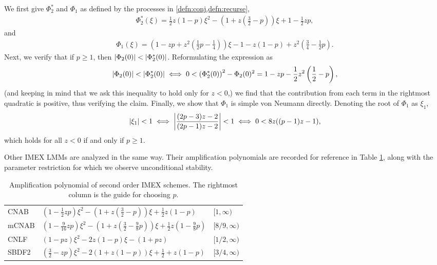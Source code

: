 We first give $\Phi_2^*$ and $\Phi_1$ as defined by the processes in \cref{defn:conj,defn:recurse},  
\begin{align}
\Phi_2^*(\xi) = \frac{1}{2}z(1-p) \xi^2 
- \left(1 + z\left(\frac{3}{2} - p \right)\right) \xi
+ 1 - \frac{1}{2}zp, 
\end{align}
and
\begin{align} 
\Phi_1(\xi) = \left(1 - zp + z^2 \left( \frac{1}{2} p - \frac{1}{4} \right) \right)\xi -1 - z(1-p) + z^2 \left( \frac{3}{4} - \frac{1}{2}p \right).
\end{align}
Next, we verify that if $p\geq 1$, then $\left|\Phi_2(0)\right| < \left|\Phi^*_2(0)\right|$. Reformulating the expression as
\begin{align*}
\left|\Phi_2(0)\right| < \left|\Phi^*_2(0)\right| 
\iff 
0 < \left(\Phi^*_2(0) \right)^2 - \Phi_2(0)^2
= 1 - zp - \frac{1}{2}z^2\left( \frac{1}{2} - p \right),
\end{align*}
(and keeping in mind that we ask this inequality to hold only for $z<0$,) we find that the contribution from each term  in the rightmost quadratic is positive, thus verifying the claim.
Finally, we show that $\Phi_1$ is simple von Neumann directly. Denoting the root of $\Phi_1$ as $\xi_1$, 
\begin{align*}
	\left|\xi_1\right| < 1 
\iff \left|\frac{(2p-3)z-2}{(2p-1)z-2}\right| < 1
\iff 0< 8z((p-1)z-1),  
\end{align*}
which holds for all $z<0$ if and only if $p\geq 1$.

Other IMEX LMMs are analyzed in the same way. Their amplification polynomials are recorded for reference in Table \ref{table:amp poly 2}, along with the parameter restriction for which we observe unconditional stability.

\begin{table}[htb!]
	\centering
	\caption[Amplification polynomials of second order IMEX]{Amplification polynomial of second order IMEX schemes. The rightmost column is the guide for choosing $p$.}
	\begin{tabular}{lll}
		\toprule[1.5pt] 
		\head{Method} 
		& \head{Amplification Polynomial}
		& \head{$p\lambda/\lambda\in$}
		\\	\midrule 
		CNAB 
		& $\left(1 - \frac{1}{2}zp\right)\xi^2
		- \left(1 + z\left(\frac{3}{2}-p \right)\right)\xi + \frac{1}{2}z(1-p)$
		& $[1,\infty)$
		\\[2.6pt]
		mCNAB 
		& $\left(1 - \frac{9}{16}zp \right) \xi^2 - \left(1 + z\left(\frac{3}{2} - \frac{9}{8} p \right) \right)\xi
		+ \frac{1}{2}z\left(1 - \frac{9}{8}p \right) $
		& $[8/9,\infty)$
		\\[2.6pt]
		CNLF 
		& $\left(1-pz\right) \xi^2 -2z(1-p)\xi -(1+pz)$
		& $[1/2,\infty)$
		\\[2.6pt]
		SBDF2 
		& $\left(\frac{3}{2} - zp\right) \xi^2
		- 2\left(1 + z(1-p)\right) \xi 
		+ \frac{1}{2} + z(1-p)
		$
		& $[3/4,\infty)$
		\\ \bottomrule[1.5pt]
	\end{tabular}
\label{table:amp poly 2}
\end{table}

